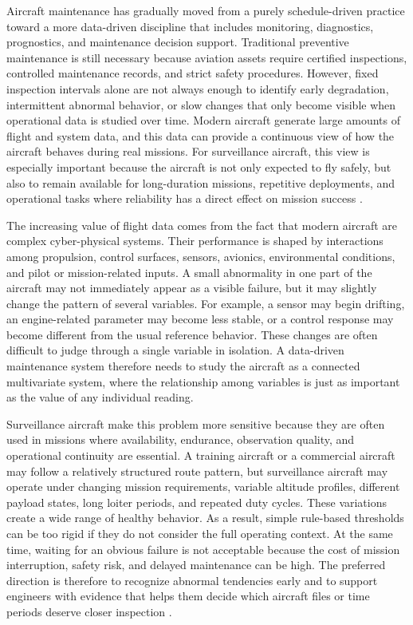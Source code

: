 \documentclass[12pt,a4paper]{report}
\begin{document}
	Aircraft maintenance has gradually moved from a purely schedule-driven practice toward a more data-driven discipline that includes monitoring, diagnostics, prognostics, and maintenance decision support. Traditional preventive maintenance is still necessary because aviation assets require certified inspections, controlled maintenance records, and strict safety procedures. However, fixed inspection intervals alone are not always enough to identify early degradation, intermittent abnormal behavior, or slow changes that only become visible when operational data is studied over time. Modern aircraft generate large amounts of flight and system data, and this data can provide a continuous view of how the aircraft behaves during real missions. For surveillance aircraft, this view is especially important because the aircraft is not only expected to fly safely, but also to remain available for long-duration missions, repetitive deployments, and operational tasks where reliability has a direct effect on mission success \cite{tumer1999survey,jardine2006cbm,basora2021fleet}.
	
	The increasing value of flight data comes from the fact that modern aircraft are complex cyber-physical systems. Their performance is shaped by interactions among propulsion, control surfaces, sensors, avionics, environmental conditions, and pilot or mission-related inputs. A small abnormality in one part of the aircraft may not immediately appear as a visible failure, but it may slightly change the pattern of several variables. For example, a sensor may begin drifting, an engine-related parameter may become less stable, or a control response may become different from the usual reference behavior. These changes are often difficult to judge through a single variable in isolation. A data-driven maintenance system therefore needs to study the aircraft as a connected multivariate system, where the relationship among variables is just as important as the value of any individual reading.
	
	Surveillance aircraft make this problem more sensitive because they are often used in missions where availability, endurance, observation quality, and operational continuity are essential. A training aircraft or a commercial aircraft may follow a relatively structured route pattern, but surveillance aircraft may operate under changing mission requirements, variable altitude profiles, different payload states, long loiter periods, and repeated duty cycles. These variations create a wide range of healthy behavior. As a result, simple rule-based thresholds can be too rigid if they do not consider the full operating context. At the same time, waiting for an obvious failure is not acceptable because the cost of mission interruption, safety risk, and delayed maintenance can be high. The preferred direction is therefore to recognize abnormal tendencies early and to support engineers with evidence that helps them decide which aircraft files or time periods deserve closer inspection \cite{verhagen2018aircraft,scott2022defence,demir2024aiaviation}.
	
\end{document}
